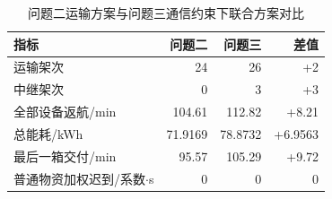\begin{table}[H]\centering\normalsize
\caption{问题二运输方案与问题三通信约束下联合方案对比}\label{tab:q2_q3_compare}
\begin{tabular}{lrrr}
\toprule
指标 & 问题二 & 问题三 & 差值\\\midrule
运输架次 & 24 & 26 & +2\\
中继架次 & 0 & 3 & +3\\
全部设备返航/min & 104.61 & 112.82 & +8.21\\
总能耗/kWh & 71.9169 & 78.8732 & +6.9563\\
最后一箱交付/min & 95.57 & 105.29 & +9.72\\
普通物资加权迟到/系数$\cdot$s & 0 & 0 & 0\\
\bottomrule\end{tabular}
\end{table}
